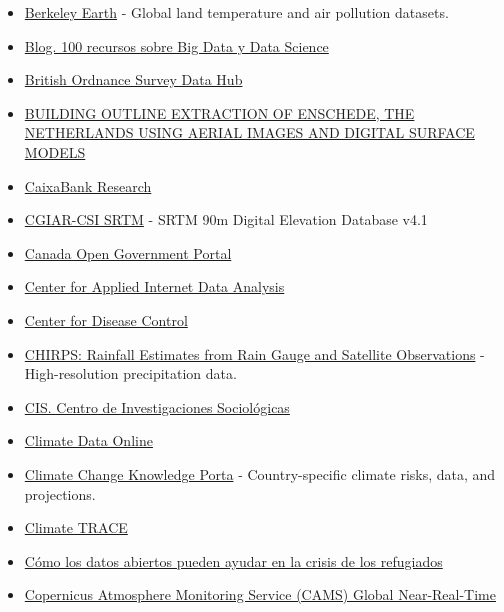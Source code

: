 \documentclass[
]{article}
\begin{document}
\begin{itemize}
{  y restauración}
\item
  \href{https://berkeleyearth.org/data/}{Berkeley Earth} - Global land
  temperature and air pollution datasets.
\item
  \href{https://www.todobi.com/mas-de-100-recursos-sobre-big-data-y/}{Blog.
  100 recursos sobre Big Data y Data Science}
\item
  \href{https://osdatahub.os.uk/}{British Ordnance Survey Data Hub}
\item
  \href{https://easy.dans.knaw.nl/ui/datasets/id/easy-dataset:257588}{BUILDING
  OUTLINE EXTRACTION OF ENSCHEDE, THE NETHERLANDS USING AERIAL IMAGES
  AND DIGITAL SURFACE MODELS}
\item
  \href{https://www.caixabankresearch.com/es}{CaixaBank Research}
\item
  \href{https://csidotinfo.wordpress.com/data/srtm-90m-digital-elevation-database-v4-1/}{CGIAR-CSI
  SRTM} - SRTM 90m Digital Elevation Database v4.1
\item
  \href{https://open.canada.ca/data/en/dataset?q=education}{Canada Open
  Government Portal}
\item
  \href{https://www.caida.org/data/overview/}{Center for Applied
  Internet Data Analysis}
\item
  \href{https://wonder.cdc.gov/}{Center for Disease Control}
\item
  \href{https://www.chc.ucsb.edu/data/chirps}{CHIRPS: Rainfall Estimates
  from Rain Gauge and Satellite Observations} - High-resolution
  precipitation data.
\item
  \href{https://www.cis.es/inicio}{CIS. Centro de Investigaciones
  Sociológicas}
\item
  \href{https://www.ncdc.noaa.gov/cdo-web/}{Climate Data Online}
\item
  \href{https://climateknowledgeportal.worldbank.org/}{Climate Change
  Knowledge Porta} - Country-specific climate risks, data, and
  projections.
\item
  \href{https://climatetrace.org/data}{Climate TRACE}
\item
  \href{https://datos.gob.es/es/blog/como-los-datos-abiertos-pueden-ayudar-en-la-crisis-de-los-refugiados?utm_source=newsletter&utm_medium=email&utm_campaign=Datos-en-tiempo-real-open-access-y-mucho-ms-en-datosgobes}{Cómo
  los datos abiertos pueden ayudar en la crisis de los refugiados}
\item
  \href{https://developers.google.com/earth-engine/datasets/catalog/ECMWF_CAMS_NRT}{Copernicus
  Atmosphere Monitoring Service (CAMS) Global Near-Real-Time}

\end{itemize}
\end{document}
